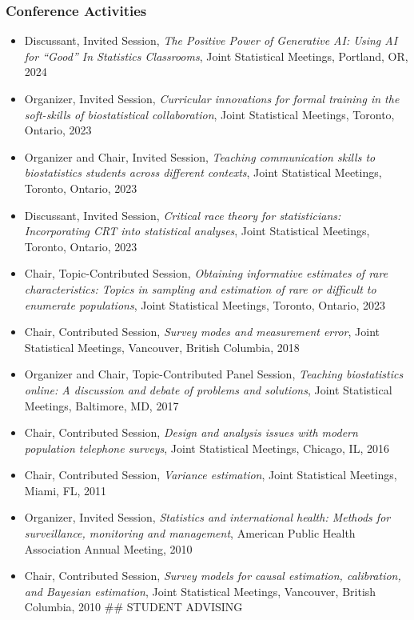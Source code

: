 \documentclass[
  english,
  letterpaper,
  DIV=11,
  numbers=noendperiod]{scrartcl}
\providecommand{\tightlist}{%
  \setlength{\itemsep}{0pt}\setlength{\parskip}{0pt}}
\begin{document}
\subsubsection{Conference Activities}\label{conference-activities}

\begin{itemize}
\tightlist
\item
  Discussant, Invited Session, \emph{The Positive Power of Generative
  AI: Using AI for ``Good'' In Statistics Classrooms}, Joint Statistical
  Meetings, Portland, OR, 2024
\item
  Organizer, Invited Session, \emph{Curricular innovations for formal
  training in the soft-skills of biostatistical collaboration}, Joint
  Statistical Meetings, Toronto, Ontario, 2023
\item
  Organizer and Chair, Invited Session, \emph{Teaching communication
  skills to biostatistics students across different contexts}, Joint
  Statistical Meetings, Toronto, Ontario, 2023
\item
  Discussant, Invited Session, \emph{Critical race theory for
  statisticians: Incorporating CRT into statistical analyses}, Joint
  Statistical Meetings, Toronto, Ontario, 2023
\item
  Chair, Topic-Contributed Session, \emph{Obtaining informative
  estimates of rare characteristics: Topics in sampling and estimation
  of rare or difficult to enumerate populations}, Joint Statistical
  Meetings, Toronto, Ontario, 2023
\item
  Chair, Contributed Session, \emph{Survey modes and measurement error},
  Joint Statistical Meetings, Vancouver, British Columbia, 2018
\item
  Organizer and Chair, Topic-Contributed Panel Session, \emph{Teaching
  biostatistics online: A discussion and debate of problems and
  solutions}, Joint Statistical Meetings, Baltimore, MD, 2017
\item
  Chair, Contributed Session, \emph{Design and analysis issues with
  modern population telephone surveys}, Joint Statistical Meetings,
  Chicago, IL, 2016
\item
  Chair, Contributed Session, \emph{Variance estimation}, Joint
  Statistical Meetings, Miami, FL, 2011
\item
  Organizer, Invited Session, \emph{Statistics and international health:
  Methods for surveillance, monitoring and management}, American Public
  Health Association Annual Meeting, 2010
\item
  Chair, Contributed Session, \emph{Survey models for causal estimation,
  calibration, and Bayesian estimation}, Joint Statistical Meetings,
  Vancouver, British Columbia, 2010 \#\# STUDENT ADVISING
\end{itemize}
\end{document}

